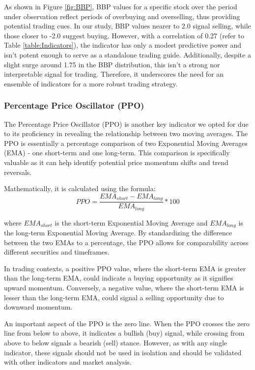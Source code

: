 \documentclass[
	letterpaper, %
]{jdf}
\begin{document}
As shown in Figure \ref{fig:BBP}, BBP values for a specific stock over the period under observation reflect periods of overbuying and overselling, thus providing potential trading cues. In our study, BBP values nearer to 2.0 signal selling, while those closer to -2.0 suggest buying. However, with a correlation of 0.27 (refer to Table \ref{table:Indicators}), the indicator has only a modest predictive power and isn't potent enough to serve as a standalone trading guide. Additionally, despite a slight surge around 1.75 in the BBP distribution, this isn't a strong nor interpretable signal for trading. Therefore, it underscores the need for an ensemble of indicators for a more robust trading strategy.



\subsubsection{Percentage Price Oscillator (PPO)}

The Percentage Price Oscillator (PPO) is another key indicator we opted for due to its proficiency in revealing the relationship between two moving averages. The PPO is essentially a percentage comparison of two Exponential Moving Averages (EMA) - one short-term and one long-term. This comparison is specifically valuable as it can help identify potential price momentum shifts and trend reversals.

Mathematically, it is calculated using the formula:
\[
PPO = \frac{EMA_{short} - EMA_{long}}{EMA_{long}} * 100
\]

where $EMA_{short}$ is the short-term Exponential Moving Average and $EMA_{long}$ is the long-term Exponential Moving Average. By standardizing the difference between the two EMAs to a percentage, the PPO allows for comparability across different securities and timeframes.

In trading contexts, a positive PPO value, where the short-term EMA is greater than the long-term EMA, could indicate a buying opportunity as it signifies upward momentum. Conversely, a negative value, where the short-term EMA is lesser than the long-term EMA, could signal a selling opportunity due to downward momentum.

An important aspect of the PPO is the zero line. When the PPO crosses the zero line from below to above, it indicates a bullish (buy) signal, while crossing from above to below signals a bearish (sell) stance. However, as with any single indicator, these signals should not be used in isolation and should be validated with other indicators and market analysis.
\end{document}
